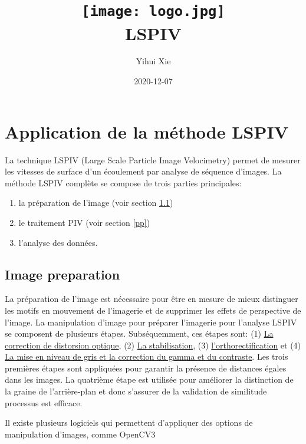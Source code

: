 \documentclass[
]{article}
\title{\texttt{[image: logo.jpg]}\\
LSPIV}
\author{Yihui Xie}
\date{2020-12-07}
\providecommand{\tightlist}{%
  \setlength{\itemsep}{0pt}\setlength{\parskip}{0pt}}
\begin{document}
\maketitle

{
\setcounter{tocdepth}{2}
\tableofcontents
}
\newpage

\hypertarget{sb}{%
\section{Application de la méthode LSPIV}\label{sb}}

La technique LSPIV (Large Scale Particle Image Velocimetry) permet de
mesurer les vitesses de surface d'un écoulement par analyse de séquence
d'images. La méthode LSPIV complète se compose de trois parties
principales:

\begin{enumerate}
\def\labelenumi{\arabic{enumi}.}
\tightlist
\item
  la préparation de l'image (voir section \ref{ip})
\item
  le traitement PIV (voir section \ref{pp})
\item
  l'analyse des données.
\end{enumerate}

\hypertarget{ip}{%
\subsection{Image preparation}\label{ip}}

La préparation de l'image est nécessaire pour être en mesure de mieux distinguer les motifs en mouvement de l'imagerie et de supprimer les effets de perspective de l'image. La manipulation d'image pour préparer l'imagerie pour l'analyse LSPIV se composent de plusieurs étapes. Subséquemment, ces étapes sont:
(1) \protect\hyperlink{la-correction-de-distorsion-optique}{La correction de distorsion optique}, (2) \protect\hyperlink{la-stabilisation}{La stabilisation}, (3) \protect\hyperlink{lorthorectification-dimage}{l'orthorectification} et
(4) \protect\hyperlink{la-mise-en-niveau-de-gris-et-la-correction-du-gamma-et-du-contraste}{La mise en niveau de gris et la correction du gamma et du contraste}. Les trois premières étapes
sont appliquées pour garantir la présence de distances égales dans les images.
La quatrième étape est utilisée pour améliorer la distinction de la graine de
l'arrière-plan et donc s'assurer de la validation de similitude
processus est efficace.

Il existe plusieurs logiciels qui permettent d'appliquer des options de manipulation d'images, comme OpenCV3\citep{noauthor_opencv_2015}
\end{document}
